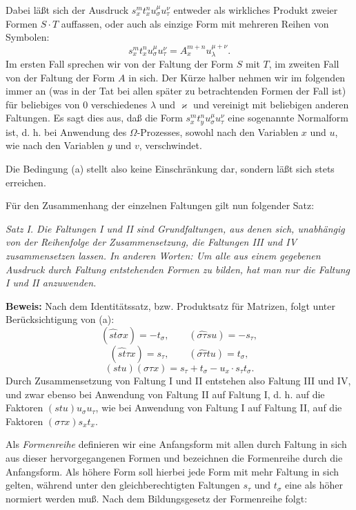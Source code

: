 Dabei läßt sich der Ausdruck $s_x^m t_x^n u_\sigma^\mu u_\tau^\nu$ entweder als wirkliches Produkt zweier Formen $S\cdot T$ auffassen, oder auch als einzige Form mit mehreren Reihen von Symbolen:
\[
s_x^m t_x^n u_\sigma^\mu u_\tau^\nu=A_x^{m+n}u_\lambda^{\mu+\nu}.
\]
Im ersten Fall sprechen wir von der Faltung der Form $S$ mit $T$, im zweiten Fall von der \glqq{}Faltung der Form $A$ in sich\grqq{}. Der Kürze halber nehmen wir im folgenden immer an (was in der Tat bei allen später zu betrachtenden Formen der Fall ist)
für beliebiges von 0 verschiedenes $\lambda$ und $\varkappa$ und vereinigt mit beliebigen anderen Faltungen. Es sagt dies aus, daß die Form $s_x^m t_y^n u_\sigma^\mu u_\tau^\nu$ eine sogenannte \glqq{}Normalform\grqq{} ist, d. h. bei Anwendung des $\Omega$-Prozesses, sowohl nach den Variablen $x$ und $u$, wie nach den Variablen $y$ und $v$, verschwindet.

Die Bedingung (a) stellt also keine Einschränkung dar, sondern läßt sich stets erreichen.

Für den Zusammenhang der einzelnen Faltungen gilt nun folgender Satz:

\emph{Satz I. Die Faltungen I und II sind Grundfaltungen, aus denen sich, unabhängig von der Reihenfolge der Zusammensetzung, die Faltungen III und IV zusammensetzen lassen. In anderen Worten: Um alle aus einem gegebenen Ausdruck durch Faltung entstehenden Formen zu bilden, hat man nur die Faltung I und II anzuwenden.}

\textbf{Beweis:} Nach dem Identitätssatz, bzw. Produktsatz für Matrizen, folgt unter Berücksichtigung von (a):
\[
(\widehat{st}\sigma x)=-t_\sigma,\qquad
(\widehat{\sigma\tau}su)=-s_\tau,
\]
\[
(\widehat{st}\tau x)=s_\tau,\qquad
(\widehat{\sigma\tau}tu)=t_\sigma,
\]
\[
(stu)(\sigma\tau x)=s_\tau+t_\sigma-u_x\cdot s_\tau t_\sigma .
\]
Durch Zusammensetzung von Faltung I und II entstehen also Faltung III und IV, und zwar ebenso bei Anwendung von Faltung II auf Faltung I, d. h. auf die Faktoren $(stu)u_\sigma u_\tau$, wie bei Anwendung von Faltung I auf Faltung II, auf die Faktoren $(\sigma\tau x)s_xt_x$.

Als \emph{Formenreihe}\setcounter{footnote}{9} definieren wir eine Anfangsform mit allen durch Faltung in sich aus dieser hervorgegangenen Formen und bezeichnen die Formenreihe durch die Anfangsform. Als \glqq{}höhere Form\grqq{} soll hierbei jede Form mit mehr Faltung in sich gelten, während unter den gleichberechtigten Faltungen $s_\tau$ und $t_\sigma$ eine als höher normiert werden muß. Nach dem Bildungsgesetz der Formenreihe folgt:

